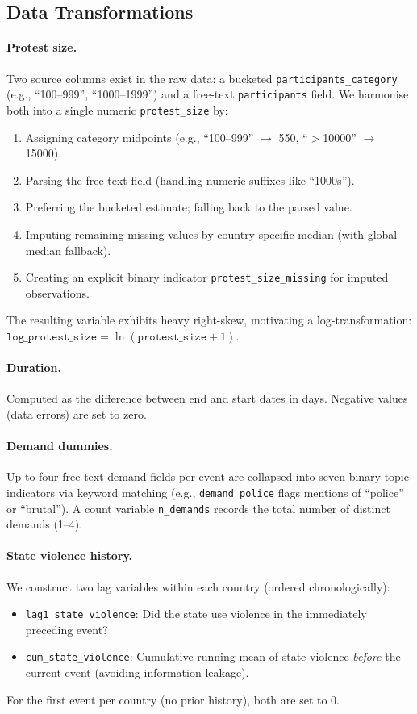 \documentclass[12pt,a4paper]{article}
\begin{document}
\subsection{Data Transformations}

\paragraph{Protest size.}
Two source columns exist in the raw data: a bucketed \texttt{participants\_category} (e.g., ``100--999'', ``1000--1999'') and a free-text \texttt{participants} field. We harmonise both into a single numeric \texttt{protest\_size} by:
\begin{enumerate}
  \item Assigning category midpoints (e.g., ``100--999'' $\to$ 550, ``$>$10000'' $\to$ 15000).
  \item Parsing the free-text field (handling numeric suffixes like ``1000s'').
  \item Preferring the bucketed estimate; falling back to the parsed value.
  \item Imputing remaining missing values by country-specific median (with global median fallback).
  \item Creating an explicit binary indicator \texttt{protest\_size\_missing} for imputed observations.
\end{enumerate}
The resulting variable exhibits heavy right-skew, motivating a log-transformation: $\texttt{log\_protest\_size} = \ln(\texttt{protest\_size} + 1)$.

\paragraph{Duration.}
Computed as the difference between end and start dates in days. Negative values (data errors) are set to zero.

\paragraph{Demand dummies.}
Up to four free-text demand fields per event are collapsed into seven binary topic indicators via keyword matching (e.g., \texttt{demand\_police} flags mentions of ``police'' or ``brutal''). A count variable \texttt{n\_demands} records the total number of distinct demands (1--4).

\paragraph{State violence history.}
We construct two lag variables within each country (ordered chronologically):
\begin{itemize}
  \item \texttt{lag1\_state\_violence}: Did the state use violence in the immediately preceding event?
  \item \texttt{cum\_state\_violence}: Cumulative running mean of state violence \emph{before} the current event (avoiding information leakage).
\end{itemize}
For the first event per country (no prior history), both are set to 0.
\end{document}
